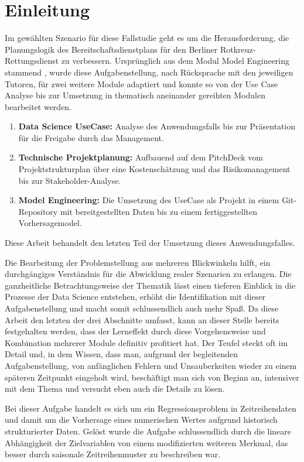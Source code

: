 \chapter{Einleitung}

Im gewählten Szenario für diese Fallstudie geht es um die Herausforderung, die Planungslogik des Bereitschaftsdienstplans für den Berliner Rotkreuz-Rettungsdienst zu verbessern. Ursprünglich aus dem Modul Model Engineering stammend \citep{pak_aufgabenstellung_dlmdwme01_2024}, wurde diese Aufgabenstellung, nach Rücksprache mit den jeweiligen Tutoren, für zwei weitere Module adaptiert und konnte so von der Use Case Analyse bis zur Umsetzung in thematisch aneinander gereihten Modulen bearbeitet werden. 

\begin{enumerate}
  \itemsep-8pt
  \item \textbf{Data Science UseCase:} Analyse des Anwendungsfalls bis zur Präsentation für die Freigabe durch das Management.
  \item \textbf{Technische Projektplanung:} Aufbauend auf dem PitchDeck vom Projektstrukturplan über eine Kostenschätzung und das Risikomanagement bis zur Stakeholder-Analyse.
  \item \textbf{Model Engineering:} Die Umsetzung des UseCase als Projekt in einem Git-Repository mit bereitgestellten Daten bis zu einem fertiggestellten Vorhersagemodel.
\end{enumerate}

Diese Arbeit behandelt den letzten Teil der Umsetzung dieses Anwendungsfalles. 

Die Bearbeitung der Problemstellung aus mehreren Blickwinkeln hilft, ein durchgängiges Verständnis für die Abwicklung realer Szenarien zu erlangen. Die ganzheitliche Betrachtungsweise der Thematik lässt einen tieferen Einblick in die Prozesse der Data Science entstehen, erhöht die Identifikation mit dieser Aufgabenstellung und macht somit schlussendlich auch mehr Spaß. Da diese Arbeit den letzten der drei Abschnitte umfasst, kann an dieser Stelle bereits festgehalten werden, dass der Lerneffekt durch diese Vorgehensweise und Kombination mehrerer Module definitiv profitiert hat. Der Teufel steckt oft im Detail und, in dem Wissen, dass man,  aufgrund der begleitenden Aufgabenstellung, von anfänglichen Fehlern und Unsauberkeiten wieder zu einem späteren Zeitpunkt eingeholt wird, beschäftigt man sich von Beginn an, intensiver mit dem Thema und versucht eben auch die Details zu lösen.

Bei dieser Aufgabe handelt es sich um ein Regressionsproblem in Zeitreihendaten und damit um die Vorhersage eines numerischen Wertes aufgrund historisch strukturierter Daten. Gelöst wurde die Aufgabe schlussendlich durch die lineare Abhängigkeit der Zielvariablen von einem modifizierten weiteren Merkmal, das besser durch saisonale Zeitreihenmuster zu beschreiben war.

	